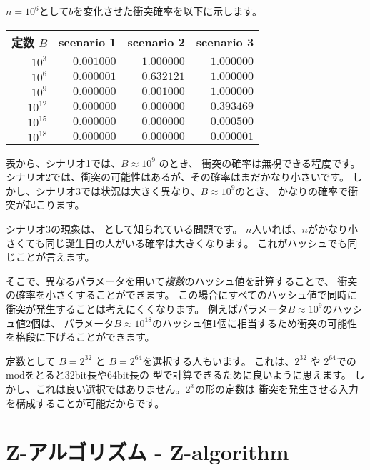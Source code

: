 $n=10^6$として$b$を変化させた衝突確率を以下に示します。

\begin{center}
\begin{tabular}{rrrr}
定数 $B$ & scenario 1 & scenario 2 & scenario 3 \\
\hline
$10^3$ & $0.001000$ & $1.000000$ & $1.000000$ \\
$10^6$ & $0.000001$ & $0.632121$ & $1.000000$ \\
$10^9$ & $0.000000$ & $0.001000$ & $1.000000$ \\
$10^{12}$ & $0.000000$ & $0.000000$ & $0.393469$ \\
$10^{15}$ & $0.000000$ & $0.000000$ & $0.000500$ \\
$10^{18}$ & $0.000000$ & $0.000000$ & $0.000001$ \\
\end{tabular}
\end{center}

表から、シナリオ1では、$B \approx 10^9$ のとき、
衝突の確率は無視できる程度です。
シナリオ2では、衝突の可能性はあるが、その確率はまだかなり小さいです。
しかし、シナリオ3では状況は大きく異なり、$B \approx 10^9$のとき、
かなりの確率で衝突が起こります。


シナリオ3の現象は、
として知られている問題です。
$n$人いれば、$n$がかなり小さくても同じ誕生日の人がいる確率は大きくなります。
これがハッシュでも同じことが言えます。

そこで、異なるパラメータを用いて\emph{複数}のハッシュ値を計算することで、
衝突の確率を小さくすることができます。
この場合にすべてのハッシュ値で同時に衝突が発生することは考えにくくなります。
例えばパラメータ$B \approx 10^9$のハッシュ値2個は、
パラメータ$B \approx 10^18$のハッシュ値1個に相当するため衝突の可能性を格段に下げることができます。

定数として $B=2^{32}$ と $B=2^{64}$を選択する人もいます。
これは、$2^{32}$ や $2^{64}$でのmodをとると32bit長や64bit長の
型で計算できるために良いように思えます。
しかし、これは良い選択ではありません。$2^x$の形の定数は
衝突を発生させる入力を構成することが可能だからです\cite{pac13}。

\section{Z-アルゴリズム - Z-algorithm}


